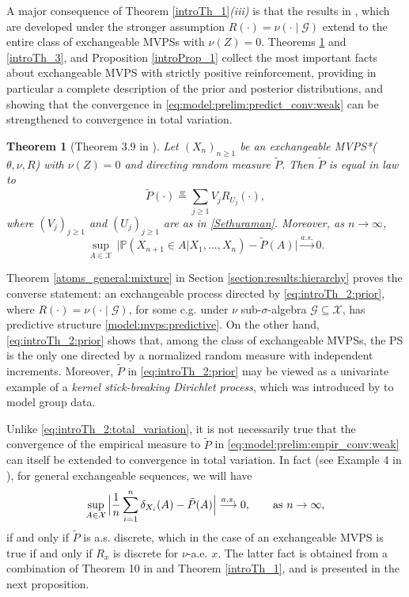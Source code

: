 \documentclass[a4paper]{article}
\theoremstyle{plain}
\newtheorem{theorem}{Theorem}
\theoremstyle{remark}
\theoremstyle{definition}
\begin{document}
A major consequence of Theorem \ref{introTh_1}\textit{(iii)} is that the results in \cite{berti2023kernel}, which are developed under the stronger assumption $R(\cdot)=\nu(\cdot\mid\mathcal{G})$ extend to the entire class of exchangeable MVPSs with $\nu(Z)=0$. Theorems \ref{introTh_2} and \ref{introTh_3}, and Proposition \ref{introProp_1} collect the most important facts about exchangeable MVPS with strictly positive reinforcement, providing in particular a complete description of the prior and posterior distributions, and showing that the convergence in \eqref{eq:model:prelim:predict_conv:weak} can be strengthened to convergence in total variation.

\begin{theorem}[Theorem 3.9 in \cite{sariev2024}]\label{introTh_2}
Let $(X_n)_{n\geq 1}$ be an exchangeable MVPS*($\theta,\nu,R$) with $\nu(Z)=0$ and directing random measure $\tilde{P}$. Then $\tilde{P}$ is equal in law to
\begin{equation}\label{eq:introTh_2:prior}
\tilde{P}(\cdot)\overset{w}{=}\sum_{j\geq1} V_jR_{U_j}(\cdot),
\end{equation}
where $(V_j)_{j\geq1}$ and $(U_j)_{j\geq1}$ are as in \eqref{Sethuraman}. Moreover, as $n\rightarrow\infty$,
\begin{equation}\label{eq:introTh_2:total_variation}
\sup_{A\in\mathcal{X}}\,\bigl|\mathbb{P}(X_{n+1}\in A|X_1,\ldots,X_n)-\tilde{P}(A)\bigr|\overset{a.s.}{\longrightarrow}0.
\end{equation}
\end{theorem}

Theorem \ref{atoms_general:mixture} in Section \ref{section:results:hierarchy} proves the converse statement: an exchangeable process directed by \eqref{eq:introTh_2:prior}, where $R(\cdot)=\nu(\cdot\mid\mathcal{G})$, for some c.g. under $\nu$ sub-$\sigma$-algebra $\mathcal{G}\subseteq\mathcal{X}$, has predictive structure \eqref{model:mvps:predictive}. On the other hand, \eqref{eq:introTh_2:prior} shows that, among the class of exchangeable MVPSs, the PS is the only one directed by a normalized random measure with independent increments. Moreover, $\tilde{P}$ in \eqref{eq:introTh_2:prior} may be viewed as a univariate example of a \textit{kernel stick-breaking Dirichlet process}, which was introduced by \cite{dunson2008} to model group data.

Unlike \eqref{eq:introTh_2:total_variation}, it is not necessarily true that the convergence of the empirical measure to $\tilde{P}$ in \eqref{eq:model:prelim:empir_conv:weak} can itself be extended to convergence in total variation. In fact (see Example 4 in \cite{berti2018}), for general exchangeable sequences, we will have
\[\sup_{A\in\mathcal{X}}\,\Bigl|\frac{1}{n}\sum_{i=1}^n\delta_{X_i}(A)-\tilde{P}(A)\Bigr|\overset{a.s.}{\longrightarrow}0,\qquad\mbox{as }n\rightarrow\infty,\]
if and only if $\tilde{P}$ is a.s. discrete, which in the case of an exchangeable MVPS is true if and only if $R_x$ is discrete for $\nu$-a.e. $x$. The latter fact is obtained from a combination of Theorem 10 in \cite{berti2023kernel} and Theorem \ref{introTh_1}, and is presented in the next proposition.
\end{document}
